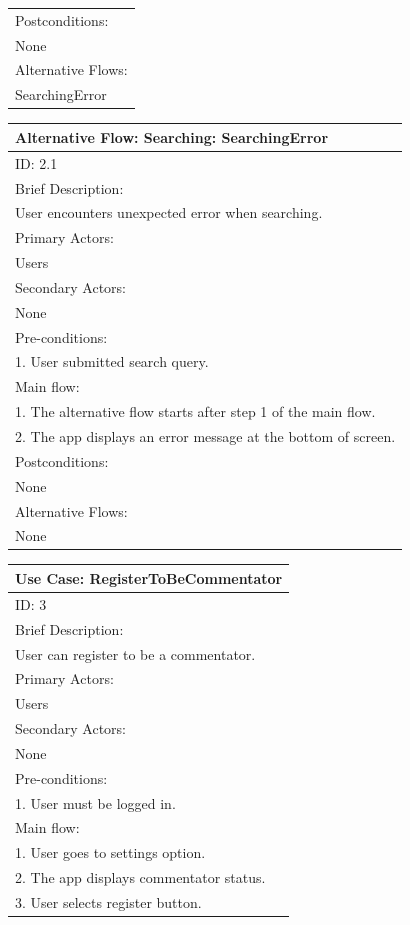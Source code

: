 \documentclass{article}
\begin{document}
\begin{flushleft}
\begin{longtable}[l]{| l |}
\hline
Postconditions:\\
None\\
\hline
Alternative Flows:\\
SearchingError\\
\hline
\end{longtable}
\begin{longtable}[l]{|l|}
\hline
Alternative Flow: Searching: SearchingError\\
\hline
ID: 2.1\\
\hline
Brief Description: \\
User encounters unexpected error when searching.\\
\hline
Primary Actors:\\
Users\\
\hline
Secondary Actors:\\
None\\
\hline
Pre-conditions:\\
1. User submitted search query.\\
\hline
Main flow:\\
1. The alternative flow starts after step 1 of the main flow.\\
2. The app displays an error message at the bottom of screen.\\
\hline
Postconditions:\\
None\\
\hline
Alternative Flows:\\
None\\
\hline
\end{longtable}
\begin{longtable}[l]{|l|}
\hline
\multicolumn{1}{|c|}{Use Case: RegisterToBeCommentator}\\
\hline
ID: 3\\
\hline
Brief Description: \\
User can register to be a commentator.\\
\hline
Primary Actors:\\
Users\\
\hline
Secondary Actors:\\
None\\
\hline
Pre-conditions:\\
1. User must be logged in.\\
\hline
Main flow:\\
1. User goes to settings option.\\
2. The app displays commentator status.\\
3. User selects register button.\\

\end{longtable}
\end{flushleft}
\end{document}
